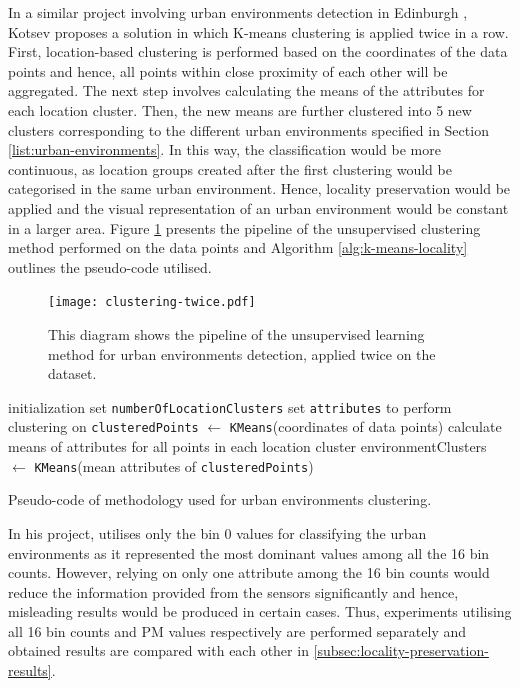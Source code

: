 \documentclass[bsc,frontabs,twoside,singlespacing, parskip,deptreport]{infthesis}     %
\begin{document}
In a similar project involving urban environments detection in Edinburgh \cite{Kotsev2015}, Kotsev proposes a solution in which K-means clustering is applied twice in a row. First, location-based clustering is performed based on the coordinates of the data points and hence, all points within close proximity of each other will be aggregated. The next step involves calculating the means of the attributes for each location cluster. Then, the new means are further clustered into 5 new clusters corresponding to the different urban environments specified in Section \ref{list:urban-environments}. In this way, the classification would be more continuous, as location groups created after the first clustering would be categorised in the same urban environment. Hence, locality preservation would be applied and  the visual representation of an urban environment would be constant in a larger area. Figure \ref{fig:clustering-twice} presents the pipeline of the unsupervised clustering method performed on the data points and Algorithm \ref{alg:k-means-locality} outlines the pseudo-code utilised.

\begin{figure}[h!]
  \center
  \texttt{[image: clustering-twice.pdf]}
  \caption{This diagram shows the pipeline of the unsupervised learning method for urban environments detection, applied twice on the dataset.}
  \label{fig:clustering-twice}
\end{figure}

\begin{algorithm}[h!]
 initialization\;
 set \texttt{numberOfLocationClusters}\;
 set \texttt{attributes} to perform clustering on\;
 \texttt{clusteredPoints} $ \leftarrow $ \texttt{KMeans}(coordinates of data points)\;
 calculate means of attributes for all points in each location cluster\;
 environmentClusters $\leftarrow$ \texttt{KMeans}(mean attributes of \texttt{clusteredPoints})\;
 \caption{Pseudo-code of methodology used for urban environments clustering.}
 \label{alg:k-means-locality}
\end{algorithm}

In his project, \cite{Kotsev2015} utilises only the bin 0 values for classifying the urban environments as it represented the most dominant values among all the 16 bin counts. However, relying on only one attribute among the 16 bin counts would reduce the information provided from the sensors significantly and hence, misleading results would be produced in certain cases. Thus, experiments utilising all 16 bin counts and PM values respectively are performed separately and obtained results are compared with each other in \ref{subsec:locality-preservation-results}.
\end{document}
